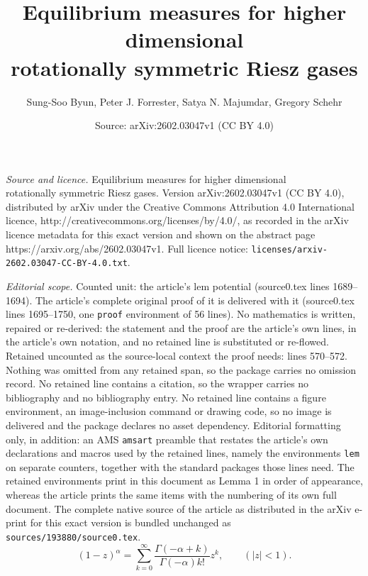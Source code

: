 \documentclass[10pt,a4paper]{amsart}
\title{Equilibrium measures for higher dimensional \\ rotationally symmetric Riesz gases}
\author{Sung-Soo Byun, Peter J. Forrester, Satya N. Majumdar, Gregory Schehr}
\date{Source: arXiv:2602.03047v1 (CC BY 4.0)}
\begin{document}
\maketitle

\noindent\emph{Source and licence.} Equilibrium measures for higher dimensional \\ rotationally symmetric Riesz gases. Version arXiv:2602.03047v1 (CC BY 4.0), distributed by arXiv under the Creative Commons Attribution 4.0 International licence, http://creativecommons.org/licenses/by/4.0/, as recorded in the arXiv licence metadata for this exact version and shown on the abstract page https://arxiv.org/abs/2602.03047v1. Full licence notice: \texttt{licenses/arxiv-2602.03047-CC-BY-4.0.txt}.\par\smallskip

\noindent\textit{Editorial scope.} Counted unit: the article's lem potential (source0.tex lines 1689--1694). The article's complete original proof of it is delivered with it (source0.tex lines 1695--1750, one \texttt{proof} environment of 56 lines). No mathematics is written, repaired or re-derived: the statement and the proof are the article's own lines, in the article's own notation, and no retained line is substituted or re-flowed.  Retained uncounted as the source-local context the proof needs: lines 570--572.  Nothing was omitted from any retained span, so the package carries no omission record.  No retained line contains a citation, so the wrapper carries no bibliography and no bibliography entry.  No retained line contains a figure environment, an image-inclusion command or drawing code, so no image is delivered and the package declares no asset dependency.  Editorial formatting only, in addition: an AMS \texttt{amsart} preamble that restates the article's own declarations and macros used by the retained lines, namely the environments \texttt{lem} on separate counters, together with the standard packages those lines need.  The retained environments print in this document as Lemma 1 in order of appearance, whereas the article prints the same items with the numbering of its own full document.  The complete native source of the article as distributed in the arXiv e-print for this exact version is bundled unchanged as \texttt{sources/193880/source0.tex}.
\begin{equation} \label{eq for binomial expansion}
(1-z)^{\alpha}= \sum_{k=0}^\infty \frac{ \Gamma(-\alpha+k) }{ \Gamma(-\alpha) k! } z^k, \qquad (|z|<1). 
\end{equation}
\end{document}
